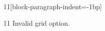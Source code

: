 \documentclass[paper=A4]{ropas-poster}
\begin{document}
\begin{postergrid}{1}{1}[block-paragraph-indent=-1bp]
\begin{posterblock}{1}{1}
Invalid grid option.
\end{posterblock}
\end{postergrid}
\end{document}
